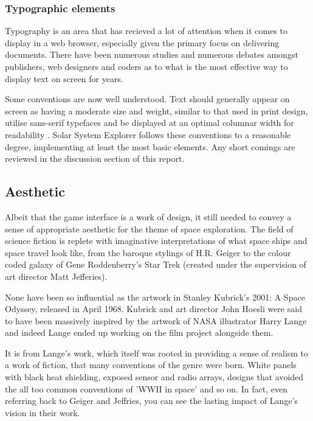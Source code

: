 \documentclass[twoside]{bhamthesis}
\begin{document}
\subsubsection{Typographic elements}

Typography is an area that has recieved a lot of attention when it comes to display in a web browser, especially given the primary focus on delivering documents. There have been numerous studies and numerous debates amongst publishers, web designers and coders as to what is the most effective way to display text on screen for years.

Some conventions are now well understood. Text should generally appear on screen as having a moderate size and weight, similar to that used in print design, utilise sans-serif typefaces and be displayed at an optimal columnar width for readability \cite{lupton_type_2014}. Solar System Explorer follows these conventions to a reasonable degree, implementing at least the most basic elements. Any short comings are reviewed in the discussion section of this report.

\subsection{Aesthetic}

Albeit that the game interface is a work of design, it still needed to convey a sense of appropriate aesthetic for the theme of space exploration. The field of science fiction is replete with imaginative interpretations of what space ships and space travel look like, from the baroque stylings of H.R. Geiger to the colour coded galaxy of Gene Roddenberry's Star Trek (created under the supervision of art director Matt Jefferies).

None have been so influential as the artwork in Stanley Kubrick's 2001: A Space Odyssey, released in April 1968. Kubrick and art director John Hoesli were said to have been massively inspired by the artwork of  NASA illustrator Harry Lange \cite{sinclair_man_2016} and indeed Lange ended up working on the film project alongside them.

It is from Lange's work, which itself was rooted in providing a sense of realism to a work of fiction, that many conventions of the genre were born. White panels with black heat shielding, exposed sensor and radio arrays, designs that avoided the all too common conventions of 'WWII in space' and so on. In fact, even referring back to Geiger and Jeffries, you can see the lasting impact of Lange's vision in their work. 
\end{document}
